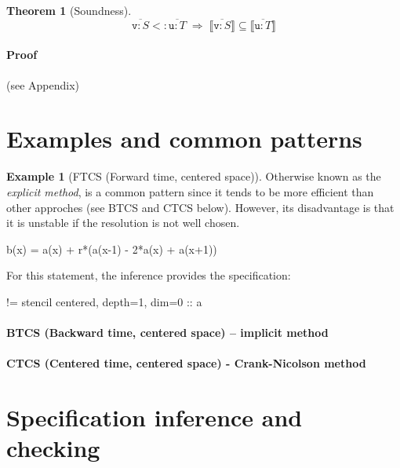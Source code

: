 \documentclass[9pt]{sigplanconf}
\newcounter{block}
\theoremstyle{definition}
\newtheorem{theorem}[block]{Theorem}
\newtheorem{example}[block]{Example}
\newcommand{\interp}[1]{\llbracket{#1}\rrbracket}
\begin{document}
\begin{theorem}[Soundness]
\[
\overline{\texttt{v} : S} <: \overline{\texttt{u} : T}
\; \Rightarrow \;
\interp{\overline{\texttt{v} : S}} \subseteq \interp{\overline{\texttt{u} : T}}
\]
\end{theorem}

\paragraph{Proof} (see Appendix)



\section{Examples and common patterns}

\begin{example}[FTCS (Forward time, centered space)]

  Otherwise known as the \emph{explicit method}, is a common
  pattern since it tends to be more efficient than other approches
  (see BTCS and CTCS below). However, its disadvantage is that it is
  unstable if the resolution is not well chosen.

\begin{ExmVerbatim}
b(x) = a(x) + r*(a(x-1) - 2*a(x) + a(x+1))
\end{ExmVerbatim}
%
For this statement, the inference provides the specification:
%
\begin{SpecVerbatim}
!=  stencil centered, depth=1, dim=0 :: a
\end{SpecVerbatim}



\end{example}

\paragraph{BTCS (Backward time, centered space) -- implicit method}

\paragraph{CTCS (Centered time, centered space) - Crank-Nicolson method}

\section{Specification inference and checking}
\label{sec:analysis}
\end{document}
